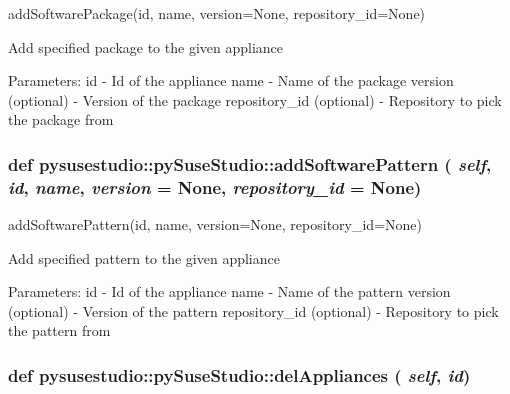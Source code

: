 \label{classpysusestudio_1_1py_suse_studio_aff587b16668414a1f2e393bf0aab6943}
\begin{DoxyVerb}addSoftwarePackage(id, name, version=None, repository_id=None)

            Add specified package to the given appliance
            
            Parameters:
id - Id of the appliance
name - Name of the package
version (optional) - Version of the package
repository_id (optional) - Repository to pick the package from

\end{DoxyVerb}
 \hypertarget{classpysusestudio_1_1py_suse_studio_ab6ed7add2eb09cde2c9b85c9b40c7e3a}{
\subsubsection[{addSoftwarePattern}]{\setlength{\rightskip}{0pt plus 5cm}def pysusestudio::pySuseStudio::addSoftwarePattern ( {\em self}, \/   {\em id}, \/   {\em name}, \/   {\em version} = {\ttfamily None}, \/   {\em repository\_\-id} = {\ttfamily None})}}
\label{classpysusestudio_1_1py_suse_studio_ab6ed7add2eb09cde2c9b85c9b40c7e3a}
\begin{DoxyVerb}addSoftwarePattern(id, name, version=None, repository_id=None)

            Add specified pattern to the given appliance
            
            Parameters:
id - Id of the appliance
name - Name of the pattern
version (optional) - Version of the pattern
repository_id (optional) - Repository to pick the pattern from

\end{DoxyVerb}
 \hypertarget{classpysusestudio_1_1py_suse_studio_a6f83ab270f1292009bc396fd51cee83f}{
\subsubsection[{delAppliances}]{\setlength{\rightskip}{0pt plus 5cm}def pysusestudio::pySuseStudio::delAppliances ( {\em self}, \/   {\em id})}}
\label{classpysusestudio_1_1py_suse_studio_a6f83ab270f1292009bc396fd51cee83f}
